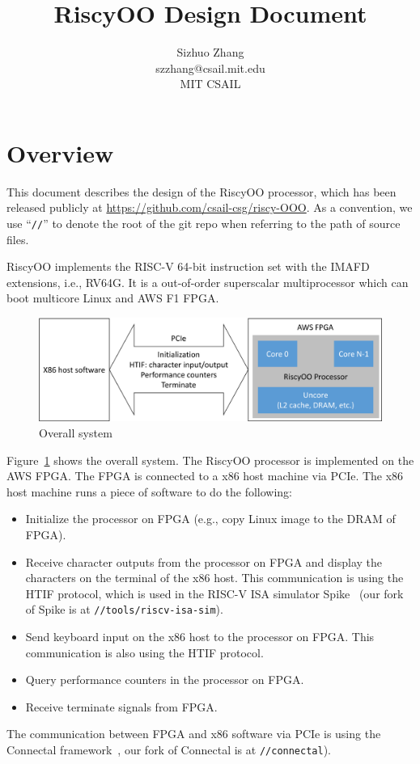 \documentclass[12pt]{article}
\newcommand{\code}[1]{\texttt{#1}}
\begin{document}
\title{RiscyOO Design Document}
\author{Sizhuo Zhang \\ szzhang@csail.mit.edu \\ MIT CSAIL}
\date{}
\maketitle

\section{Overview}

This document describes the design of the RiscyOO processor, which has been released publicly at \url{https://github.com/csail-csg/riscy-OOO}.
As a convention, we use ``\code{//}'' to denote the root of the git repo when referring to the path of source files.

RiscyOO implements the RISC-V 64-bit instruction set with the IMAFD extensions, i.e., RV64G.
It is a out-of-order superscalar multiprocessor which can boot multicore Linux and AWS F1 FPGA.

\begin{figure}[!htb]
    \centering
    \includegraphics[width=\columnwidth]{fig/system_crop.pdf}
    \caption{Overall system}\label{fig:sys}
\end{figure}

Figure~\ref{fig:sys} shows the overall system.
The RiscyOO processor is implemented on the AWS FPGA.
The FPGA is connected to a x86 host machine via PCIe.
The x86 host machine runs a piece of software to do the following:
\begin{itemize}
    \item Initialize the processor on FPGA (e.g., copy Linux image to the DRAM of FPGA).
    \item Receive character outputs from the processor on FPGA and display the characters on the terminal of the x86 host.
    This communication is using the HTIF protocol, which is used in the RISC-V ISA simulator Spike~\cite{spike} (our fork of Spike is at \code{//tools/riscv-isa-sim}).
    \item Send keyboard input on the x86 host to the processor on FPGA.
    This communication is also using the HTIF protocol.
    \item Query performance counters in the processor on FPGA.
    \item Receive terminate signals from FPGA.
\end{itemize}
The communication between FPGA and x86 software via PCIe is using the Connectal framework~\cite{connectal}, our fork of Connectal is at \code{//connectal}).
\end{document}
